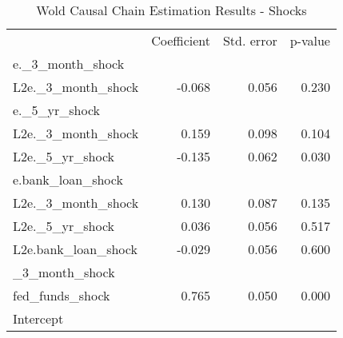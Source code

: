 \begin{table}[!h]
\caption{Wold Causal Chain Estimation Results - Shocks}
\centering
\begin{tabular}{llll}
\cline{1-4}
\multicolumn{1}{c}{} &
  \multicolumn{1}{|r}{Coefficient} &
  \multicolumn{1}{r}{Std. error} &
  \multicolumn{1}{r}{p-value} \\
\cline{1-4}
\multicolumn{1}{l}{e.\_3\_month\_shock} &
  \multicolumn{1}{|r}{} &
  \multicolumn{1}{r}{} &
  \multicolumn{1}{r}{} \\
\multicolumn{1}{l}{\hspace{1em}L2e.\_3\_month\_shock} &
  \multicolumn{1}{|r}{-0.068} &
  \multicolumn{1}{r}{0.056} &
  \multicolumn{1}{r}{0.230} \\
\multicolumn{1}{l}{e.\_5\_yr\_shock} &
  \multicolumn{1}{|r}{} &
  \multicolumn{1}{r}{} &
  \multicolumn{1}{r}{} \\
\multicolumn{1}{l}{\hspace{1em}L2e.\_3\_month\_shock} &
  \multicolumn{1}{|r}{0.159} &
  \multicolumn{1}{r}{0.098} &
  \multicolumn{1}{r}{0.104} \\
\multicolumn{1}{l}{\hspace{1em}L2e.\_5\_yr\_shock} &
  \multicolumn{1}{|r}{-0.135} &
  \multicolumn{1}{r}{0.062} &
  \multicolumn{1}{r}{0.030} \\
\multicolumn{1}{l}{e.bank\_loan\_shock} &
  \multicolumn{1}{|r}{} &
  \multicolumn{1}{r}{} &
  \multicolumn{1}{r}{} \\
\multicolumn{1}{l}{\hspace{1em}L2e.\_3\_month\_shock} &
  \multicolumn{1}{|r}{0.130} &
  \multicolumn{1}{r}{0.087} &
  \multicolumn{1}{r}{0.135} \\
\multicolumn{1}{l}{\hspace{1em}L2e.\_5\_yr\_shock} &
  \multicolumn{1}{|r}{0.036} &
  \multicolumn{1}{r}{0.056} &
  \multicolumn{1}{r}{0.517} \\
\multicolumn{1}{l}{\hspace{1em}L2e.bank\_loan\_shock} &
  \multicolumn{1}{|r}{-0.029} &
  \multicolumn{1}{r}{0.056} &
  \multicolumn{1}{r}{0.600} \\
\multicolumn{1}{l}{\_3\_month\_shock} &
  \multicolumn{1}{|r}{} &
  \multicolumn{1}{r}{} &
  \multicolumn{1}{r}{} \\
\multicolumn{1}{l}{\hspace{1em}fed\_funds\_shock} &
  \multicolumn{1}{|r}{0.765} &
  \multicolumn{1}{r}{0.050} &
  \multicolumn{1}{r}{0.000} \\
\multicolumn{1}{l}{\hspace{1em}Intercept} &

\end{tabular}
\end{table}
